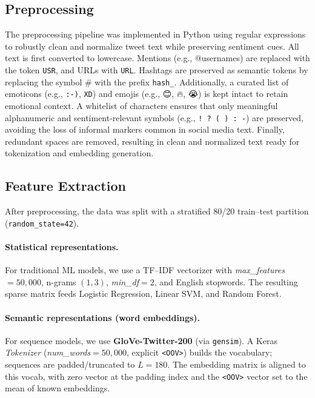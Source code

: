 \documentclass[10pt]{article}
\begin{document}
\subsection{Preprocessing}
The preprocessing pipeline was implemented in Python using regular expressions to robustly clean and normalize tweet text while preserving sentiment cues.
All text is first converted to lowercase. Mentions (e.g., @usernames) are replaced with the token \texttt{USR}, and URLs with \texttt{URL}.
Hashtags are preserved as semantic tokens by replacing the symbol \# with the prefix \texttt{hash\_}.
Additionally, a curated list of emoticons (e.g., \texttt{:-)}, \texttt{XD}) and emojis (e.g., 😊, 🔥, 😭) is kept intact to retain emotional context.
A whitelist of characters ensures that only meaningful alphanumeric and sentiment-relevant symbols (e.g., \texttt{! ? ( ) : -}) are preserved, avoiding the loss of informal markers common in social media text.
Finally, redundant spaces are removed, resulting in clean and normalized text ready for tokenization and embedding generation.
\subsection{Feature Extraction}
After preprocessing, the data was split with a stratified 80/20 train--test partition (\texttt{random\_state=42}).

\paragraph{Statistical representations.}
For traditional ML models, we use a TF--IDF vectorizer with \textit{max\_features} $=50{,}000$, n-grams $(1,3)$, \textit{min\_df}$=2$, and English stopwords. The resulting sparse matrix feeds Logistic Regression, Linear SVM, and Random Forest.

\paragraph{Semantic representations (word embeddings).}
For sequence models, we use \textbf{GloVe-Twitter-200} (via \texttt{gensim}). A Keras \textit{Tokenizer} (\textit{num\_words}$=50{,}000$, explicit \texttt{<OOV>}) builds the vocabulary; sequences are padded/truncated to $L=180$. The embedding matrix is aligned to this vocab, with zero vector at the padding index and the \texttt{<OOV>} vector set to the mean of known embeddings.
\end{document}
